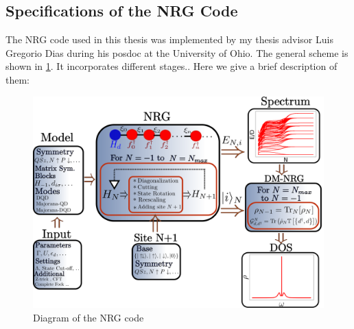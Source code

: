 





\subsection{Specifications of the NRG Code }

The NRG code used in this thesis was implemented by my thesis advisor Luis Gregorio Dias during his posdoc at the University of Ohio.  The general scheme  is shown in \ref{fig:Code}. It incorporates different stages.. Here we give a brief description of them:

\begin{figure}[t]
\centering
\includegraphics[scale=0.4]{IMAGES/NRG/NRGcode.png}
\caption{\label{fig:Code} Diagram of the NRG code}
\end{figure}

